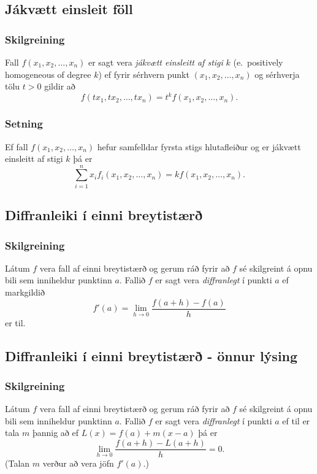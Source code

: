 \subsection{Jákvætt einsleit föll} 

\subsubsection{Skilgreining }

Fall $f(x_1, x_2, \ldots, x_n)$ er sagt vera {\em jákvætt einsleitt af stigi} $k$ (e.~positively homogeneous of degree $k$) ef fyrir sérhvern punkt $(x_1, x_2, \ldots, x_n)$ og sérhverja tölu $t>0$ gildir að 
$$f(tx_1, tx_2, \ldots, tx_n)=t^kf(x_1, x_2, \ldots, x_n).$$


\subsubsection{Setning }
 Ef fall $f(x_1, x_2, \ldots, x_n)$ hefur samfelldar fyrsta stigs hlutafleiður og er jákvætt einsleitt af stigi $k$ þá er 
$$\sum_{i=1}^n x_if_i(x_1, x_2, \ldots, x_n)=kf(x_1, x_2, \ldots, x_n).$$ 
 



\subsection{Diffranleiki í einni breytistærð} 

\subsubsection{Skilgreining  }
  Látum $f$ vera fall af einni breytistærð og gerum ráð fyrir að $f$ sé
skilgreint á opnu bili sem inniheldur punktinn $a$.  Fallið $f$ er
sagt vera {\em diffranlegt} í punkti $a$ ef markgildið
$$f'(a)=\lim_{h\rightarrow 0}\frac{f(a+h)-f(a)}{h}$$
er til.



\subsection{Diffranleiki í einni breytistærð - önnur lýsing} 

\subsubsection{Skilgreining  }
Látum $f$ vera fall af einni breytistærð og gerum ráð fyrir að $f$ sé
skilgreint á opnu bili sem inniheldur punktinn $a$.  Fallið $f$ er
sagt vera {\em diffranlegt} í punkti $a$ ef til er tala $m$ þannig að
ef $L(x)=f(a)+m(x-a)$ þá er 
$$\lim_{h\rightarrow 0}\frac{f(a+h)-L(a+h)}{h}=0.$$
(Talan $m$ verður að vera jöfn $f'(a)$.)


